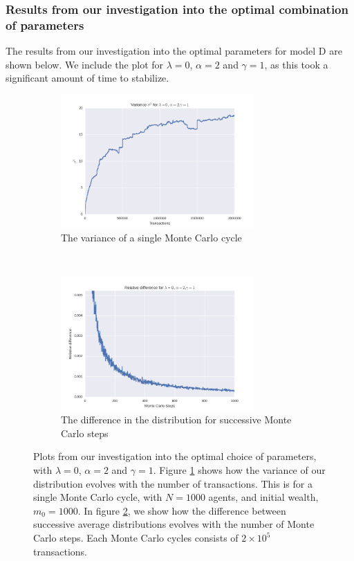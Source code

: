 \documentclass[a4paper, 10pt]{article}
\begin{document}
\subsubsection{Results from our investigation into the optimal combination of parameters}
The results from our investigation into the optimal parameters for model D are shown below. We include the plot for $\lambda = 0$, $\alpha=2$ and $\gamma=1$, as this took a significant amount of time to stabilize.
\begin{figure}[!ht]
    \centering
    \begin{subfigure}[H!]{0.5\textwidth}
        \centering
        \includegraphics[height=2.0in]{varL0A2G1.png}
        \caption{The variance of a single Monte Carlo cycle}\label{fig:ModelD_var}
    \end{subfigure}%
    ~ 
    \begin{subfigure}[H!]{0.5\textwidth}
        \centering
        \includegraphics[height=2.0in]{relDiffL0A2G1.png}
        \caption{The difference in the distribution for successive Monte Carlo steps}\label{fig:ModelD_MC_steps}
    \end{subfigure}
    \caption{Plots from our investigation into the optimal choice of parameters, with $\lambda = 0$, $\alpha=2$ and $\gamma=1$. Figure \ref{fig:ModelD_var} shows how the variance of our distribution evolves with the number of transactions. This is for a single Monte Carlo cycle, with $N=1000$ agents, and initial wealth, $m_0=1000$. In figure \ref{fig:ModelD_MC_steps}, we show how the difference between successive average distributions evolves with the number of Monte Carlo steps. Each Monte Carlo cycles consists of $2\times 10^5$ transactions.}\label{fig:ModelD_parameters}
\end{figure} %
\end{document}
